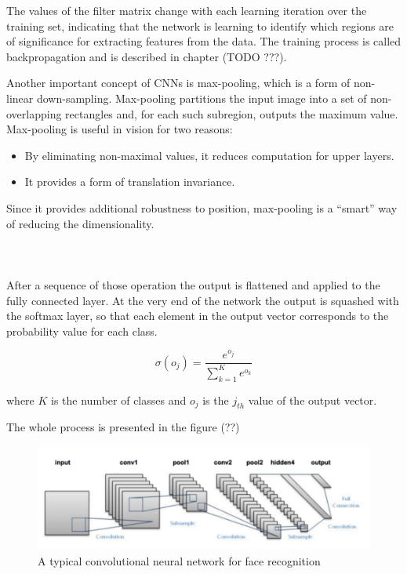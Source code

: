 The values of the filter matrix change with each learning iteration over the training set, indicating that the network is learning to identify which regions are of significance for extracting features from the data. The training process is called backpropagation and is described in chapter (TODO ???).

Another important concept of CNNs is max-pooling, which is a form of non-linear down-sampling. Max-pooling partitions the input image into a set of non- overlapping rectangles and, for each such subregion, outputs the maximum value.
Max-pooling is useful in vision for two reasons: 

\begin{itemize}
\itemsep0em 
\item By eliminating non-maximal values, it reduces computation for upper layers.
\item It provides a form of translation invariance.
\end{itemize}

Since it provides additional robustness to position, max-pooling is a “smart” way of reducing the dimensionality.
\\\\\\\\
After a sequence of those operation the output is flattened and applied to the fully connected layer.
At the very end of the network the output is squashed with the softmax layer, so that each element in the output vector corresponds to the probability value for each class.

\begin{equation}
\sigma(o_{j}) = \frac{e^{o_{j}}}{\sum_{k=1}^{K} e^{o_{k}}}
\end{equation}

where $K$ is the number of classes and $o_{j}$ is the $j_{th}$ value of the output vector.

The whole process is presented in the figure (??) 

\begin{figure}[H]
\centering
\includegraphics[scale=0.7]{img/proces.png}
\caption{A typical convolutional neural network for face recognition}
\end{figure}

